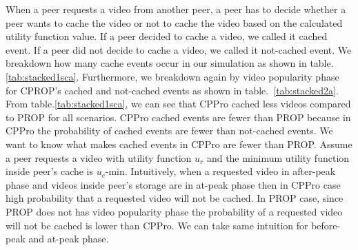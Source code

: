 \documentclass[10pt,final,journal,a4paper]{IEEEtran}
\begin{document}

When a peer requests a video from another peer, a peer has to decide whether a peer wants to cache the video or not to cache the video based on the calculated utility function value.  
If a peer decided to cache a video, we called it cached event.
If a peer did not decide to cache a video, we called it not-cached event.
We breakdown how many cache events occur in our simulation as shown in table.\ref{tab:stacked1sca}.
Furthermore, we breakdown again by video popularity phase for CPROP's cached and not-cached events as shown in table.~\ref{tab:stacked2a}.
From table.\ref{tab:stacked1sca}, we can see that CPPro cached less videos compared to PROP for all scenarios.
CPPro cached events are fewer than PROP because in CPPro the probability of cached events are fewer than not-cached events. 
We want to know what makes cached events in CPPro are fewer than PROP.
Assume a peer requests a video with utility function $u_r$ and the minimum utility function inside peer's cache is $u_c$-min. %
Intuitively, when a requested video in after-peak phase and  videos inside peer's storage are in at-peak phase then in CPPro case high probability that a requested video will not be cached.  
In PROP case, since PROP does not has video popularity phase the probability of a requested video will not be cached is lower than CPPro.
We can take same intuition for before-peak and at-peak phase.

\end{document}
